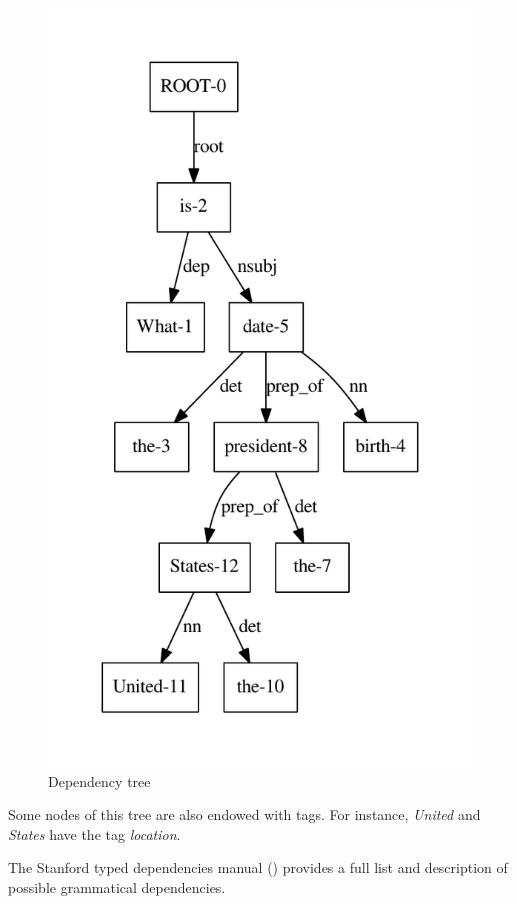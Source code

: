 \begin{figure}
  \centering
  \label{tree_one}
    \includegraphics[scale=0.6]{../examples_NLP_classical/tree1.pdf}
  \caption{Dependency tree}
\end{figure}

Some nodes of this tree are also endowed with tags. For instance, \emph{United} and \emph{States} have the tag \emph{location}.

The Stanford typed dependencies manual (\cite{stanfordDep}) provides a full list and description of possible grammatical dependencies.

